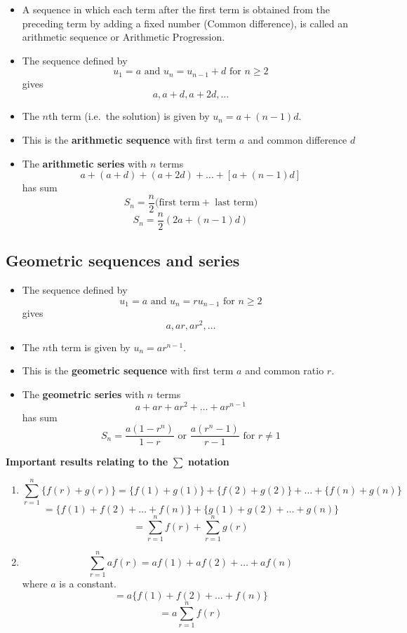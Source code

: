 \documentclass[]{book}
\begin{document}
\begin{itemize}
\item
  A sequence in which each term after the first term is obtained from the preceding term by adding a fixed number (Common difference), is called an arithmetic sequence or Arithmetic Progression.
\item
  The sequence defined by
  \[u_1=a \text{ and } u_n=u_{n-1} + d \text{ for } n\geq2\]
  gives
  \[a,a+d, a+2d,\dots\]
\item
  The \(n\)th term (i.e.~the solution) is given by \(u_n = a + (n −1)d\).
\item
  This is the \textbf{arithmetic sequence} with first term \(a\) and common difference \(d\)
\item
  The \textbf{arithmetic series} with \(n\) terms
  \[a+(a+d)+(a+2d)+\dots+ [a+(n-1)d]\]
  has sum
  \[S_n = \frac{n}{2}(\text{first term} + \text{ last term)}\]
  \[S_n = \frac{n}{2}(2a+(n-1)d)\]
\end{itemize}

\hypertarget{geometric-sequences-and-series}{%
\subsection{Geometric sequences and series}\label{geometric-sequences-and-series}}

\begin{itemize}
\item
  The sequence defined by
  \[u_1=a \text{ and } u_n=ru_{n-1} \text{ for } n\geq2\]
  gives
  \[a,ar, ar^2,\dots\]
\item
  The \(n\)th term is given by \(u_n = ar^{n −1}\).
\item
  This is the \textbf{geometric sequence} with first term \(a\) and common ratio \(r\).
\item
  The \textbf{geometric series} with \(n\) terms
  \[a+ar+ar^2+\dots+ ar^{n-1}\]
  has sum
  \[S_n = \frac{a(1-r^n)}{1-r} \text{ or }  \frac{a(r^n-1)}{r-1} \text{ for } r\neq1\]
\end{itemize}

\textbf{Important results relating to the} \(\sum\) \textbf{notation}

\begin{enumerate}
\def\labelenumi{(\arabic{enumi})}
\item
  \[\sum_{r=1}^n\{f(r)+ g(r)\} = \{f(1)+ g(1)\}+ \{f(2)+ g(2)\}+\dots + \{f(n)+ g(n)\}\]
  \[= \{f(1)+ f(2)+ \dots+ f(n)\}+ \{g(1)+ g(2)+\dots +g(n)\}\]
  \[= \sum_{r=1}^nf(r)+ \sum_{r=1}^ng(r)\]
\item
  \[\sum_{r=1}^naf(r)= af(1)+ af(2)+ \dots+ af(n)\] where \(a\) is a constant.
  \[=a\{f(1)+ f(2)+ \dots+ f(n)\}\]
  \[=a\sum_{r=1}^nf(r)\]
\end{enumerate}
\end{document}
